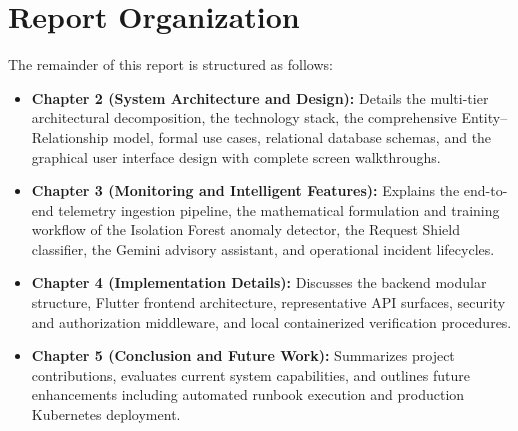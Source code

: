 \section{Report Organization}
The remainder of this report is structured as follows:
\begin{itemize}
  \item \textbf{Chapter 2 (System Architecture and Design):} Details the multi-tier architectural decomposition, the technology stack, the comprehensive Entity--Relationship model, formal use cases, relational database schemas, and the graphical user interface design with complete screen walkthroughs.
  \item \textbf{Chapter 3 (Monitoring and Intelligent Features):} Explains the end-to-end telemetry ingestion pipeline, the mathematical formulation and training workflow of the Isolation Forest anomaly detector, the Request Shield classifier, the Gemini advisory assistant, and operational incident lifecycles.
  \item \textbf{Chapter 4 (Implementation Details):} Discusses the backend modular structure, Flutter frontend architecture, representative API surfaces, security and authorization middleware, and local containerized verification procedures.
  \item \textbf{Chapter 5 (Conclusion and Future Work):} Summarizes project contributions, evaluates current system capabilities, and outlines future enhancements including automated runbook execution and production Kubernetes deployment.
\end{itemize}
